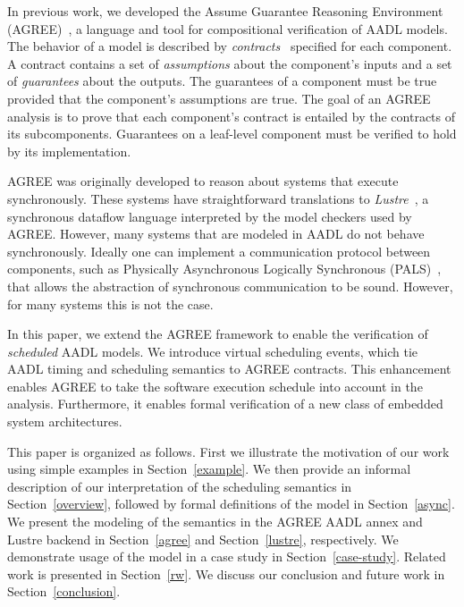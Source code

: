 In previous work, we developed the Assume Guarantee Reasoning Environment (AGREE)~\cite{8625938}, a language and tool for compositional verification of AADL models.  The behavior of a model is described by {\em contracts}~\cite{CoCoSpec} specified for each component.  A contract contains a set of {\em assumptions} about the component's inputs and a set of {\em guarantees} about the outputs.  The guarantees of a component must be true provided that the component's assumptions are true.  The goal of an AGREE analysis is to prove that each component's contract is entailed by the contracts of its subcomponents.  Guarantees on a leaf-level component must be verified to hold by its implementation.  

AGREE was originally developed to reason about systems that execute synchronously. These systems have straightforward translations to \emph{Lustre}~\cite{lustre}, a synchronous dataflow language interpreted by the model checkers used by AGREE. However, many systems that are modeled in AADL do not behave synchronously. Ideally one can implement a communication protocol between components, such as Physically Asynchronous Logically Synchronous (PALS)~\cite{pals}, that allows the abstraction of synchronous communication to be sound. However, for many systems this is not the case.

In this paper, we extend the AGREE framework to enable the verification of \textit{scheduled} AADL models. We introduce virtual scheduling events, which tie AADL timing and scheduling semantics to AGREE contracts. This enhancement enables AGREE to take the software execution schedule into account in the analysis. Furthermore, it enables formal verification of a new class of embedded system architectures. 

This paper is organized as follows. First we illustrate the motivation of our work using simple examples in Section~\ref{example}. We then provide an informal description of our interpretation of the scheduling semantics in Section~\ref{overview}, followed by formal definitions of the model in Section~\ref{async}. We present the modeling of the semantics in the AGREE AADL annex and Lustre backend in Section~\ref{agree} and Section~\ref{lustre}, respectively. We demonstrate usage of the model in a case study in Section~\ref{case-study}. Related work is presented in Section~\ref{rw}.  We discuss our conclusion and future work in Section~\ref{conclusion}.  
